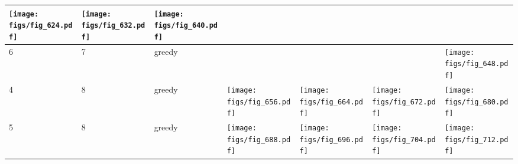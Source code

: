 \documentclass[oneside,canadian,landscape]{article}
\begin{document}
\begin{center}
\begin{longtable}{|l|l|l||l|l|l|l|}
\begin{minipage}{3.5cm}
\texttt{[image: figs/fig\_624.pdf]}
\end{minipage}
&\begin{minipage}{3.5cm}
\texttt{[image: figs/fig\_632.pdf]}
\end{minipage}
&\begin{minipage}{3.5cm}
\texttt{[image: figs/fig\_640.pdf]}
\end{minipage}
\\ \hline
6&7&greedy&&&&\begin{minipage}{3.5cm}
\texttt{[image: figs/fig\_648.pdf]}
\end{minipage}
\\ \hline
4&8&greedy&\begin{minipage}{3.5cm}
\texttt{[image: figs/fig\_656.pdf]}
\end{minipage}
&\begin{minipage}{3.5cm}
\texttt{[image: figs/fig\_664.pdf]}
\end{minipage}
&\begin{minipage}{3.5cm}
\texttt{[image: figs/fig\_672.pdf]}
\end{minipage}
&\begin{minipage}{3.5cm}
\texttt{[image: figs/fig\_680.pdf]}
\end{minipage}
\\ \hline
5&8&greedy&\begin{minipage}{3.5cm}
\texttt{[image: figs/fig\_688.pdf]}
\end{minipage}
&\begin{minipage}{3.5cm}
\texttt{[image: figs/fig\_696.pdf]}
\end{minipage}
&\begin{minipage}{3.5cm}
\texttt{[image: figs/fig\_704.pdf]}
\end{minipage}
&\begin{minipage}{3.5cm}
\texttt{[image: figs/fig\_712.pdf]}
\end{minipage}
\\ \hline
\end{longtable}
\end{center}
\end{document}
